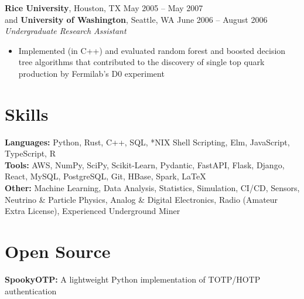 \documentclass[margin,line]{resume}
\begin{document}
\begin{resume}
    \textbf{Rice University}, Houston, TX \hfill May 2005 -- May 2007 \vspace{1mm}\\\vspace{1mm}%
    and \textbf{University of Washington}, Seattle, WA \hfill June 2006 -- August 2006 \vspace{1mm}\\\vspace{1mm}%
    \textsl{Undergraduate Research Assistant}
    \begin{itemize}
    \item Implemented (in C++) and evaluated random forest and boosted decision tree algorithms that contributed to the discovery of single top quark production by Fermilab's D0 experiment
    \end{itemize}

    \section{\mysidestyle Skills}\vspace{0mm}%
    \textbf{Languages:} Python, Rust, C++, SQL, *NIX Shell Scripting, Elm, JavaScript, TypeScript, R
    \vspace{1mm}\\\vspace{0mm}%
    \textbf{Tools:} AWS, NumPy, SciPy, Scikit-Learn, Pydantic, FastAPI, Flask, Django, React, MySQL, PostgreSQL, Git, HBase, Spark, \LaTeX
    \vspace{1mm}\\\vspace{0mm}%
    \textbf{Other:} Machine Learning, Data Analysis, Statistics, Simulation, CI/CD, Sensors, Neutrino \& Particle Physics, Analog \& Digital Electronics, Radio (Amateur Extra License), Experienced Underground Miner

    \section{\mysidestyle Open Source}\vspace{0mm}%
    \textbf{SpookyOTP:} A lightweight Python implementation of TOTP/HOTP authentication
    \vspace{1mm}%


\end{resume}
\end{document}
